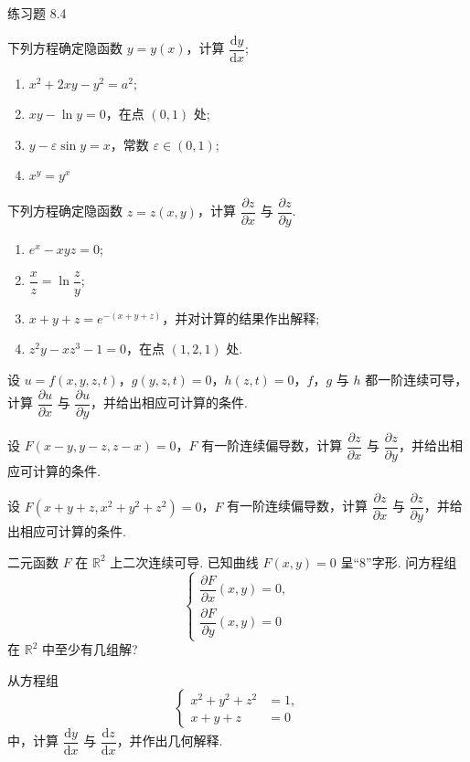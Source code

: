 \begin{exblock}{练习题 8.4}
\item 下列方程确定隐函数 $y = y(x)$，计算 $\dfrac{\mathrm{d}y}{\mathrm{d}x}$;
\begin{enumerate}
  \item[(1)] $x^{2} + 2xy - y^{2} = a^{2}$;
  \item[(2)] $xy - \ln y = 0$，在点 $(0,1)$ 处;
  \item[(3)] $y - \varepsilon \sin y = x$，常数 $\varepsilon \in (0,1)$;
  \item[(4)] $x^{y} = y^{x}$
\end{enumerate}

\item 下列方程确定隐函数 $z = z(x,y)$，计算 $\dfrac{\partial z}{\partial x}$ 与 $\dfrac{\partial z}{\partial y}$.
\begin{enumerate}
  \item[(1)] $e^{x} - xyz = 0$;
  \item[(2)] $\dfrac{x}{z} = \ln\dfrac{z}{y}$;
  \item[(3)] $x + y + z = e^{-(x+y+z)}$，并对计算的结果作出解释;
  \item[(4)] $z^{2}y - xz^{3} - 1 = 0$，在点 $(1,2,1)$ 处.
\end{enumerate}

\item 设 $u = f(x,y,z,t)$，$g(y,z,t) = 0$，$h(z,t) = 0$，$f$，$g$ 与 $h$ 都一阶连续可导，计算 $\dfrac{\partial u}{\partial x}$ 与 $\dfrac{\partial u}{\partial y}$，并给出相应可计算的条件.

\item 设 $F(x-y,y-z,z-x) = 0$，$F$ 有一阶连续偏导数，计算 $\dfrac{\partial z}{\partial x}$ 与 $\dfrac{\partial z}{\partial y}$，并给出相应可计算的条件.

\item 设 $F(x+y+z,x^{2}+y^{2}+z^{2}) = 0$，$F$ 有一阶连续偏导数，计算 $\dfrac{\partial z}{\partial x}$ 与 $\dfrac{\partial z}{\partial y}$，并给出相应可计算的条件.

\item 二元函数 $F$ 在 $\mathbb{R}^{2}$ 上二次连续可导. 已知曲线 $F(x,y) = 0$ 呈“8”字形. 问方程组
\[
  \begin{cases}
    \dfrac{\partial F}{\partial x}(x,y) = 0, \\[4pt]
    \dfrac{\partial F}{\partial y}(x,y) = 0
  \end{cases}
\]
在 $\mathbb{R}^{2}$ 中至少有几组解?

\item 从方程组
\[
  \left\{\begin{aligned}
    x^{2} + y^{2} + z^{2} &= 1, \\
    x + y + z &= 0
  \end{aligned}\right.
\]
中，计算 $\dfrac{\mathrm{d}y}{\mathrm{d}x}$ 与 $\dfrac{\mathrm{d}z}{\mathrm{d}x}$，并作出几何解释.


\end{exblock}
